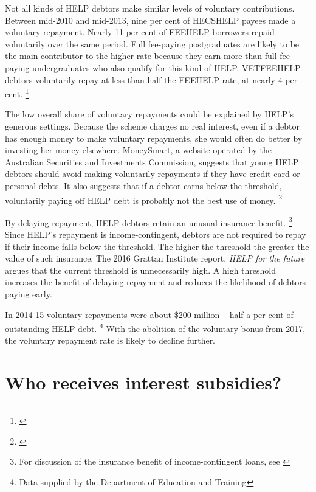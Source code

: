 \documentclass[embargoed]{grattan}
\begin{document}
Not all kinds of \gls{HELP} debtors make similar levels of voluntary contributions.
Between mid-2010 and mid-2013, nine per cent of \gls{HECSHELP} payees made a voluntary repayment.
Nearly 11 per cent of \gls{FEEHELP} borrowers repaid voluntarily over the same period.
Full fee-paying postgraduates are likely to be the main contributor to the higher rate because they earn more than full fee-paying undergraduates who also qualify for this kind of \gls{HELP}.
\gls{VETFEEHELP} debtors voluntarily repay at less than half the \gls{FEEHELP} rate, at nearly 4 per cent.%
\footnote{\textcite[][p. 33]{ANAO2016AdministrationHigherEducation}}

The low overall share of voluntary repayments could be explained by \gls{HELP}'s generous settings.
Because the scheme charges no real interest, even if a debtor has enough money to make voluntary repayments, she would often do better by investing her money elsewhere.
MoneySmart, a website operated by the Australian Securities and Investments Commission, suggests that young \gls{HELP} debtors should avoid making voluntarily repayments if they have credit card or personal debts.
It also suggests that if a debtor earns below the threshold, voluntarily paying off \gls{HELP} debt is probably not the best use of money.%
\footnote{\textcite{MoneySmart2016Payingyouruni}}

By delaying repayment, \gls{HELP} debtors retain an unusual insurance benefit.%
\footnote{For discussion of the insurance benefit of income-contingent loans, see \textcite[][p. 36]{Chapman2014Incomecontingentloans}} Since \gls{HELP}'s repayment is income-contingent, debtors are not required to repay if their income falls below the threshold.
The higher the threshold the greater the value of such insurance.
The 2016 Grattan Institute report, \emph{HELP for the future} argues that the current threshold is unnecessarily high.
A high threshold increases the benefit of delaying repayment and reduces the likelihood of debtors paying early.

In 2014-15 voluntary repayments were about \$200 million -- half a per cent of outstanding \gls{HELP} debt.%
\footnote{Data supplied by the Department of Education and Training} With the abolition of the voluntary bonus from 2017, the voluntary repayment rate is likely to decline further.

\chapter{Who receives interest subsidies?}\label{chap:3-who-receives-interest-subsidies}
\end{document}
